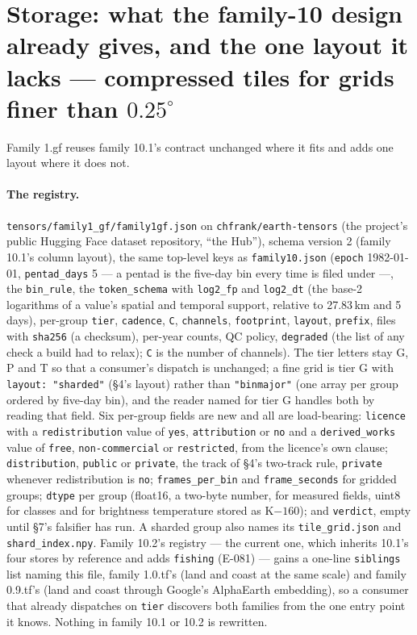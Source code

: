 \documentclass[10pt]{article}
\newcommand{\code}[1]{\texttt{#1}}
\begin{document}
\section{Storage: what the family-10 design already gives, and the one layout it lacks --- compressed tiles for grids finer than $0.25^\circ$}

Family 1.gf reuses family 10.1's contract unchanged where it fits and adds one
layout where it does not.

\paragraph{The registry.} \code{tensors/\allowbreak family1\_gf/\allowbreak family1gf.json} on
\code{chfrank/earth-tensors} (the project's public Hugging Face dataset repository, ``the Hub''), schema version 2 (family 10.1's column layout), the same top-level keys as
\code{family10.json} (\code{epoch} 1982-01-01, \code{pentad\_days} 5 --- a pentad is the five-day bin every time is filed under ---, the
\code{bin\_rule}, the \code{token\_schema} with \code{log2\_fp} and
\code{log2\_dt} (the base-2 logarithms of a value's spatial and temporal support, relative to 27.83\,km and 5 days), per-group \code{tier}, \code{cadence}, \code{C},
\code{channels}, \code{footprint}, \code{layout}, \code{prefix}, files with
\code{sha256} (a checksum), per-year counts, QC policy, \code{degraded} (the list of any check a build had to relax); \code{C} is the number of channels). The tier letters stay G, P and T so that a consumer's dispatch is
unchanged; a fine grid is tier G with \code{layout: "sharded"} (\S4's
layout) rather than \code{"binmajor"} (one array per group ordered by five-day bin), and the reader named for tier G
handles both by reading that field. Six per-group fields are new and all
are load-bearing: \code{licence} with a \code{redistribution} value of
\code{yes}, \code{attribution} or \code{no} and a \code{derived\_works} value
of \code{free}, \code{non-commercial} or \code{restricted}, from the
licence's own clause; \code{distribution}, \code{public} or \code{private},
the track of \S4's two-track rule, \code{private} whenever redistribution is
\code{no}; \code{frames\_per\_bin} and
\code{frame\_seconds} for gridded groups; \code{dtype} per group (float16, a two-byte number,
for measured fields, uint8 for classes and for brightness temperature stored
as K$-160$); and \code{verdict}, empty until \S7's falsifier has run. A
sharded group also names its \code{tile\_grid.json} and
\code{shard\_index.npy}. Family 10.2's registry --- the
current one, which inherits 10.1's four stores by reference and adds
\code{fishing} (E-081) --- gains a one-line \code{siblings} list naming this
file, family 1.0.tf's (land and coast at the same scale) and family 0.9.tf's (land and coast through Google's AlphaEarth embedding), so a consumer that already dispatches on \code{tier}
discovers both families from the one entry point it knows. Nothing in family
10.1 or 10.2 is rewritten.
\end{document}
